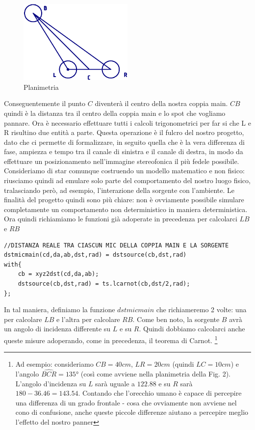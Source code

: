 \documentclass{article}
\begin{document}
    \begin{figure}[H]
        \centering
        \includegraphics[width=0.5\textwidth]{images/PLANIMETRIA.png}
         \caption{\label{fig2}Planimetria}
    \end{figure}

    Conseguentemente il punto $C$ diventerà il centro della nostra coppia main. $CB$ quindi è la distanza tra il centro della coppia main e lo spot che vogliamo pannare.
    Ora è necessario effettuare tutti i calcoli trigonometrici per far si che L e R risultino due entità a parte. Questa operazione è il fulcro del nostro progetto, dato che ci permette di formalizzare, in seguito quella che è la vera differenza di fase, ampiezza e tempo tra il canale di sinistra e il canale di destra, in modo da effettuare un posizionamento nell'immagine stereofonica il più fedele possibile. Consideriamo di star comunque costruendo un modello matematico e non fisico: riusciamo quindi ad emulare solo parte del comportamento del nostro luogo fisico, tralasciando però, ad esempio, l'interazione della sorgente con l'ambiente. Le finalità del progetto quindi sono più chiare: non è ovviamente possibile simulare completamente un comportamento non deterministico in maniera deterministica.
    Ora quindi richiamiamo le funzioni già adoperate in precedenza per calcolarci $LB$ e $RB$ \\
    
    \begin{lstlisting}
//DISTANZA REALE TRA CIASCUN MIC DELLA COPPIA MAIN E LA SORGENTE
dstmicmain(cd,da,ab,dst,rad) = dstsource(cb,dst,rad)
with{
    cb = xyz2dst(cd,da,ab);
    dstsource(cb,dst,rad) = ts.lcarnot(cb,dst/2,rad);
};
    \end{lstlisting}
    
    In tal maniera, definiamo la funzione $dstmicmain$ che richiameremo 2 volte: una per calcolare $LB$ e l'altra per calcolare $RB$.
    Come ben noto, la sorgente $B$ avrà un angolo di incidenza differente su $L$ e su $R$. Quindi dobbiamo calcolarci anche queste misure adoperando, come in precedenza, il teorema di Carnot.
    \footnote{Ad esempio: consideriamo $CB = 40 cm$, $LR = 20cm$ (quindi $LC=10cm$) e l'angolo $\widehat{BCR} = 135°$ (così come avviene nella planimetria della Fig. 2). L'angolo d'incidenza su $L$ sarà uguale a $122.88$ e su $R$ sarà $180-36.46=143.54$. Contando che l'orecchio umano è capace di percepire una differenza di un grado frontale - cosa che ovviamente non avviene nel cono di confusione, anche queste piccole differenze aiutano a percepire meglio l'effetto del nostro panner}
    
\end{document}
